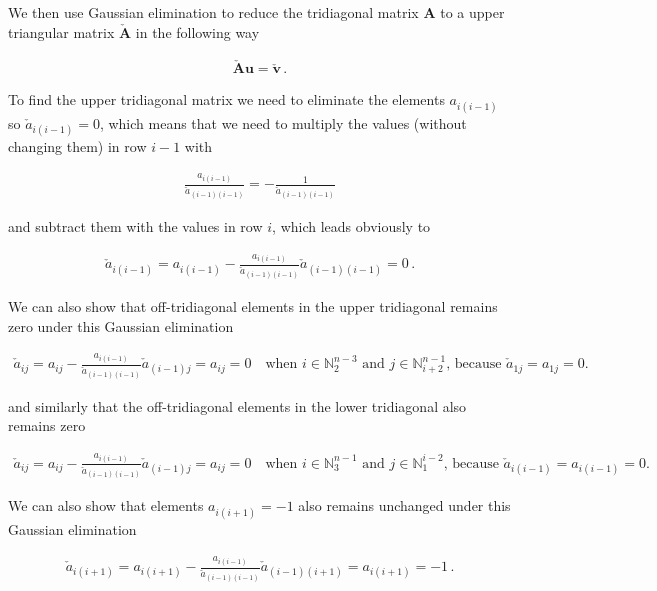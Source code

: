 \documentclass[11pt,english,a4paper]{article}
\begin{document}
\begin{flushleft}
We then use Gaussian elimination to reduce the tridiagonal matrix $\textbf{A}$ to a upper triangular matrix $\check{\textbf{A}}$ in the following way

\begin{align*}
\check{\textbf{A}}\textbf{u} = \check{\textbf{v}}\,.
\end{align*} 

To find the upper tridiagonal matrix we need to eliminate the elements $a_{i(i-1)}$ so $\check{a}_{i(i-1)} = 0$, which means that we need to multiply the values (without changing them) in row $i-1$ with 

\begin{align*}
\frac{a_{i(i-1)}}{\check{a}_{(i-1)(i-1)}} = -\frac{1}{\check{a}_{(i-1)(i-1)}} 
\end{align*}

and subtract them with the values in row $i$, which leads obviously to

\begin{align*}
\check{a}_{i(i-1)} = a_{i(i-1)} - \frac{a_{i(i-1)}}{\check{a}_{(i-1)(i-1)}} \check{a}_{(i-1)(i-1)} = 0\,.
\end{align*}

We can also show that off-tridiagonal elements in the upper tridiagonal remains zero under this Gaussian elimination

\begin{align*}
\check{a}_{ij} = a_{ij} - \frac{a_{i(i-1)}}{\check{a}_{(i-1)(i-1)}} \check{a}_{(i-1)j} = a_{ij} = 0 \quad \text{when $i\in\mathbb{N}_2^{n-3}$ and $j\in\mathbb{N}_{i+2}^{n-1}$, because $\check{a}_{1j}=a_{1j} = 0$.}
\end{align*}

and similarly that the off-tridiagonal elements in the lower tridiagonal also remains zero

\begin{align*}
\check{a}_{ij} = a_{ij} - \frac{a_{i(i-1)}}{\check{a}_{(i-1)(i-1)}} \check{a}_{(i-1)j} = a_{ij} = 0 \quad \text{when $i\in\mathbb{N}_3^{n-1}$ and $j\in\mathbb{N}_{1}^{i-2}$, because $\check{a}_{i(i-1)}=a_{i(i-1)} = 0$.}
\end{align*}

We can also show that elements $a_{i(i+1)}=-1$ also remains unchanged under this Gaussian elimination

\begin{align*}
\check{a}_{i(i+1)} = a_{i(i+1)} - \frac{a_{i(i-1)}}{\check{a}_{(i-1)(i-1)}} \check{a}_{(i-1)(i+1)} = a_{i(i+1)} = -1 \,.
\end{align*}


\end{flushleft}
\end{document}
